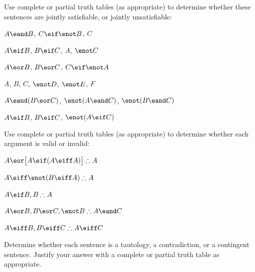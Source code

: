 \problempart
\label{pr.TT.satisfiable4}
Use complete or partial truth tables (as appropriate) to determine whether these sentences are jointly satisfiable, or jointly unsatisfiable:
\begin{compactlist}
\item $A \eand B$, $C\eif \enot B$, $C$ %
\item $A\eif B$, $B\eif C$, $A$, $\enot C$ %
\item $A \eor B$, $B\eor C$, $C\eif \enot A$ %
\item $A$, $B$, $C$, $\enot D$, $\enot E$, $F$ %
\item $A \eand (B \eor C)$, $\enot(A \eand C)$, $\enot(B \eand C)$ %
\item $A \eif B$, $B \eif C$, $\enot(A \eif C)$ %
\end{compactlist}

\problempart
\label{pr.TT.valid4}
Use complete or partial truth tables (as appropriate) to determine whether each argument is valid or invalid:
\begin{compactlist}
\item $A\eor\bigl[A\eif(A\eiff A)\bigr] \therefore A$ %
\item $A\eiff\enot(B\eiff A) \therefore A$ %
\item $A\eif B, B \therefore A$ %
\item $A\eor B, B\eor C, \enot B \therefore A \eand C$ %
\item $A\eiff B, B\eiff C \therefore A\eiff C$ %
\end{compactlist}

\problempart
\label{pr.TT.TTorC3}
Determine whether each sentence is a tautology, a contradiction, or a contingent sentence. Justify your answer with a complete or partial truth table as appropriate.



